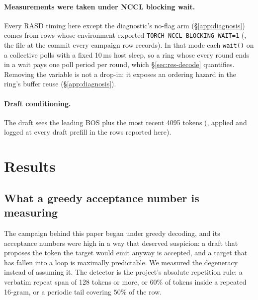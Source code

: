 \documentclass{article}
\begin{document}
\paragraph{Measurements were taken under NCCL blocking wait.} Every RASD timing here except the
diagnostic's no-flag arm (\S\ref{app:diagnosis}) comes from rows whose environment exported
\texttt{TORCH\_NCCL\_BLOCKING\_WAIT=1} (, the file
at the commit every campaign row records). In that mode each \texttt{wait()} on a collective
polls with a fixed 10\,ms host sleep, so a ring whose every round ends in a wait pays one poll
period per round, which \S\ref{sec:res-decode} quantifies. Removing the variable is not a
drop-in: it exposes an ordering hazard in the ring's buffer reuse (\S\ref{app:diagnosis}).

\paragraph{Draft conditioning.} The draft sees the leading BOS plus the most recent 4095
tokens (, applied and logged at every draft prefill in
the rows reported here).

\section{Results}
\label{sec:results}

\subsection{What a greedy acceptance number is measuring}
\label{sec:res-degeneracy}

The campaign behind this paper began under greedy decoding, and its acceptance numbers were
high in a way that deserved suspicion: a draft that proposes the token the target would emit
anyway is accepted, and a target that has fallen into a loop is maximally predictable. We
measured the degeneracy instead of assuming it. The detector is the project's absolute
repetition rule: a verbatim repeat span of 128 tokens or more, or $60\%$ of tokens inside a
repeated 16-gram, or a periodic tail covering $50\%$ of the row.
\end{document}
